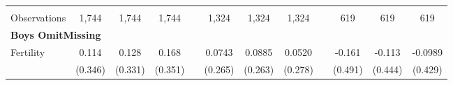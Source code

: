 \begin{landscape}
\begin{table}[htpb!]
\begin{center}
\begin{tabular}{lcccp{2mm}cccp{2mm}ccc}
\begin{footnotesize}\end{footnotesize}&\begin{footnotesize}\end{footnotesize}&\begin{footnotesize}\end{footnotesize}&\begin{footnotesize}\end{footnotesize}&\begin{footnotesize}\end{footnotesize}&\begin{footnotesize}\end{footnotesize}&\begin{footnotesize}\end{footnotesize}&\begin{footnotesize}\end{footnotesize}&\begin{footnotesize}\end{footnotesize}&\begin{footnotesize}\end{footnotesize}&\begin{footnotesize}\end{footnotesize}&\begin{footnotesize}\end{footnotesize}\\Observations&1,744&1,744&1,744&&1,324&1,324&1,324&&619&619&619\\
\multicolumn{12}{l}{\textbf{Boys OmitMissing}}\\ 
Fertility&0.114&0.128&0.168&&0.0743&0.0885&0.0520&&-0.161&-0.113&-0.0989\\
&(0.346)&(0.331)&(0.351)&&(0.265)&(0.263)&(0.278)&&(0.491)&(0.444)&(0.429)\\

\end{tabular}
\end{center}
\end{table}
\end{landscape}
